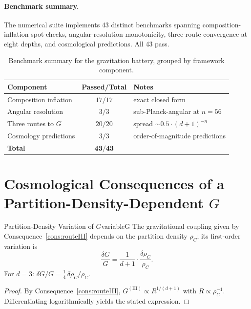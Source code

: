 \paragraph{Benchmark summary.}
The numerical suite implements 43 distinct benchmarks spanning
composition-inflation spot-checks, angular-resolution monotonicity,
three-route convergence at eight depths, and cosmological predictions.
All 43 pass.

\begin{table}[H]
\centering\small
\caption{Benchmark summary for the gravitation battery, grouped by framework component.}
\label{tab:Gbenchmarks}
\begin{tabular}{lcl}
\toprule
Component & Passed/Total & Notes\\
\midrule
Composition inflation & $17/17$ & exact closed form\\
Angular resolution    & $3/3$   & sub-Planck-angular at $n=56$\\
Three routes to $G$   & $20/20$ & spread $\sim 0.5\cdot(d{+}1)^{-n}$\\
Cosmology predictions & $3/3$   & order-of-magnitude predictions\\
\midrule
\textbf{Total} & $\mathbf{43/43}$ & \\
\bottomrule
\end{tabular}
\end{table}

\section{Cosmological Consequences of a Partition-Density-Dependent $G$}
\label{sec:ch20-cosmology}

\begin{consequence}{Partition-Density Variation of $G$}{variableG}
  The gravitational coupling given by Consequence~\ref{cons:routeIII} depends
  on the partition density $\rho_{C}$; its first-order variation is
  \begin{equation}
    \frac{\delta G}{G} = \frac{1}{d+1}\cdot\frac{\delta\rho_{C}}{\rho_{C}}.
  \end{equation}
  For $d = 3$: $\delta G/G = \tfrac{1}{4}\,\delta\rho_{C}/\rho_{C}$.
\end{consequence}

\begin{proof}
By Consequence~\ref{cons:routeIII}, $G^{(\mathrm{III})} \propto R^{1/(d+1)}$
with $R \propto \rho_{C}^{-1}$.
Differentiating logarithmically yields the stated expression.
\end{proof}

